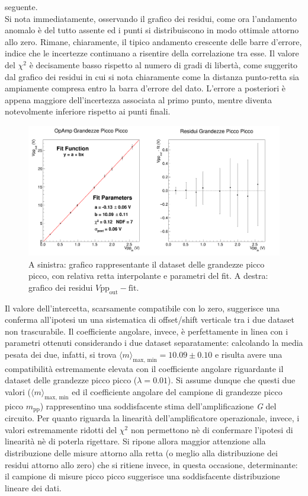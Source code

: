 \documentclass[a4paper,11pt]{article} %
\begin{document}
seguente. \\
Si nota immediatamente, osservando il grafico dei residui, come ora l'andamento anomalo è del tutto assente ed i punti
si distribuiscono in modo ottimale attorno allo zero. Rimane, chiaramente, il tipico andamento crescente delle barre
d'errore, indice che le incertezze continuano a risentire della correlazione tra esse. Il valore del $\chi^2$ è
decisamente basso rispetto al numero di gradi di libertà, come suggerito dal grafico dei residui in cui si nota
chiaramente come la distanza punto-retta sia ampiamente compresa entro la barra d'errore del dato. L'errore a posteriori
è appena maggiore dell'incertezza associata al primo punto, mentre diventa notevolmente inferiore rispetto ai punti
finali. 

\begin{figure}[H]
	\centering
	\includegraphics[width=15cm]{../Plots/Report_Plots/opamp_plot_pp_projected.png}
	\caption{\small A sinistra: grafico rappresentante il dataset delle grandezze picco picco, 
	con relativa retta interpolante e parametri del fit. A destra: grafico dei residui $V\text{pp}_{\text{out}}-\text{fit}$.}
	\label{i:opamp_pp}
\end{figure}

\noindent  Il valore dell'intercetta, scarsamente compatibile con lo zero, suggerisce una conferma all'ipotesi un una
sistematica di offset/shift verticale tra i due dataset non trascurabile. Il coefficiente angolare, invece, è
perfettamente in linea con i parametri ottenuti considerando i due dataset separatamente: calcolando la media pesata dei
due, infatti, si trova $\langle m\rangle_{\text{max, min}}=10.09 \pm 0.10$ e risulta avere una compatibilità
estremamente elevata con il coefficiente angolare riguardante il dataset delle grandezze picco picco ($\lambda = 0.01$).
Si assume dunque che questi due valori ($\langle m\rangle_{\text{max, min}}$ ed il coefficiente angolare del campione di
grandezze picco picco $m_{\text{pp}}$) rappresentino una soddisfacente stima dell'amplificazione \textit{G} del
circuito. Per quanto riguarda la linearità dell'amplificatore operazionale, invece, i valori estremamente ridotti del
$\chi^2$ non permettono nè di confermare l'ipotesi di linearità nè di poterla rigettare. Si ripone allora maggior
attenzione alla distribuzione delle misure attorno alla retta (o meglio alla distribuzione dei residui attorno allo
zero) che si ritiene invece, in questa occasione, determinante: il campione di misure picco picco suggerisce una
soddisfacente distribuzione lineare dei dati. 
\end{document}
